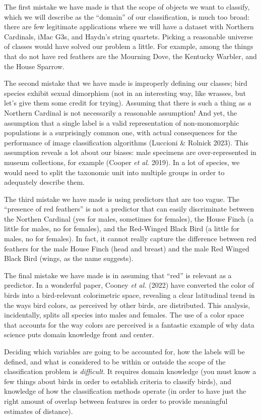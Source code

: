 \documentclass[
  letterpaper,
]{scrbook}
\begin{document}
The first mistake we have made is that the scope of objects we want to
classify, which we will describe as the ``domain'' of our
classification, is much too broad: there are few legitimate applications
where we will have a dataset with Northern Cardinals, iMac G3s, and
Haydn's string quartets. Picking a reasonable universe of classes would
have solved our problem a little. For example, among the things that do
not have red feathers are the Mourning Dove, the Kentucky Warbler, and
the House Sparrow.

The second mistake that we have made is improperly defining our classes;
bird species exhibit sexual dimorphism (not in an interesting way, like
wrasses, but let's give them some credit for trying). Assuming that
there is such a thing as \emph{a} Northern Cardinal is not necessarily a
reasonable assumption! And yet, the assumption that a single label is a
valid representation of non-monomorphic populations is a surprisingly
common one, with actual consequences for the performance of image
classification algorithms (Luccioni \& Rolnick 2023). This assumption
reveals a lot about our biases: male specimens are over-represented in
museum collections, for example (Cooper \emph{et al.} 2019). In a lot of
species, we would need to split the taxonomic unit into multiple groups
in order to adequately describe them.

The third mistake we have made is using predictors that are too vague.
The ``presence of red feathers'' is not a predictor that can easily
discriminate between the Northen Cardinal (yes for males, sometimes for
females), the House Finch (a little for males, no for females), and the
Red-Winged Black Bird (a little for males, no for females). In fact, it
cannot really capture the difference between red feathers for the male
House Finch (head and breast) and the male Red Winged Black Bird (wings,
as the name suggests).

The final mistake we have made is in assuming that ``red'' is relevant
as a predictor. In a wonderful paper, Cooney \emph{et al.} (2022) have
converted the color of birds into a bird-relevant colorimetric space,
revealing a clear latitudinal trend in the ways bird colors, as
perceived by other birds, are distributed. This analysis, incidentally,
splits all species into males and females. The use of a color space that
accounts for the way colors are perceived is a fantastic example of why
data science puts domain knowledge front and center.

Deciding which variables are going to be accounted for, how the labels
will be defined, and what is considered to be within or outside the
scope of the classification problem is \emph{difficult}. It requires
domain knowledge (you must know a few things about birds in order to
establish criteria to classify birds), and knowledge of how the
classification methods operate (in order to have just the right amount
of overlap between features in order to provide meaningful estimates of
distance).
\end{document}
